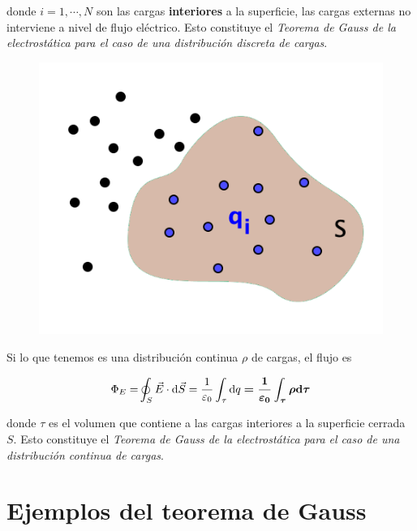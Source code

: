 \begin{multicols}{2}
donde $i=1,\cdots , N$ son las cargas \textbf{interiores} a la superficie, las cargas externas no interviene a nivel de flujo eléctrico. Esto constituye el \emph{Teorema de Gauss de la electrostática para el caso de una distribución discreta de cargas}.

\begin{figure}[H]
	\centering
	\includegraphics[width=.3\textwidth]{imagenes/imagenes23/T23IM07.png}
\end{figure}
\end{multicols}

Si lo que tenemos es una distribución continua $\rho$ de cargas, el flujo es

$$\displaystyle \displaystyle{ \Phi_E=} \oint_S \vec E \cdot \dd \vec S=\dfrac 1 {\varepsilon_0} \int_\tau \dd q \boldsymbol{ = \dfrac 1 {\varepsilon_0} \int_\tau \rho \dd \tau}$$

donde $\tau$ es el volumen que contiene a  las cargas interiores a la superficie cerrada $S$.
Esto constituye el \emph{Teorema de Gauss de la electrostática para el caso de una distribución continua de cargas}.

\section{Ejemplos del teorema de Gauss}

